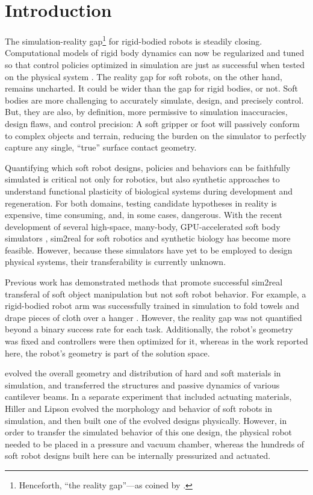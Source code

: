 \section{Introduction}
\label{sec:intro}

The simulation-reality gap\footnote{Henceforth, ``the reality gap''---as coined by \citet{jakobi1995noise}.} for rigid-bodied robots is steadily closing.
Computational models of rigid body dynamics can now be regularized and tuned so that control policies optimized in simulation are just as successful when tested on the physical system \cite{bongard2006resilient,hwangbo2019learning}.
The reality gap for soft robots, on the other hand, remains uncharted.
It could be wider than the gap for rigid bodies, or not.
Soft bodies are more challenging to accurately simulate, design, and precisely control.
But, they are also, by definition, more permissive to simulation inaccuracies, design flaws, and control precision: 	
A soft gripper or foot will passively conform to complex objects and terrain, reducing the burden on the simulator to perfectly capture any single, ``true'' surface contact geometry.

Quantifying which soft robot designs, policies and behaviors can be faithfully simulated is critical not only for robotics, but also synthetic approaches to understand functional plasticity of biological systems during development and regeneration.
For both domains, testing candidate hypotheses in reality is expensive, time consuming, and, in some cases, dangerous.
With the recent development of several high-space, many-body, GPU-accelerated 
soft body simulators \cite{holden2019subspace,macklin2019non},
sim2real for soft robotics and synthetic biology has become more feasible.
However, because these simulators have yet to be employed to design physical systems, their transferability is currently unknown.

Previous work has demonstrated methods that promote successful sim2real transferal of soft object manipulation but not soft robot behavior.
For example, a rigid-bodied robot arm was successfully trained in simulation to fold towels and drape pieces of cloth over a hanger \cite{matas2018sim}.
However, the reality gap was not quantified beyond a binary success rate for each task.
Additionally, the robot's geometry was fixed and controllers were then optimized for it, whereas in the work reported here, the robot's geometry is part of the solution space.

\citet{hiller2012automatic} evolved the overall geometry and distribution of hard and soft materials in simulation, and transferred the structures and passive dynamics of various cantilever beams.
In a separate experiment that included actuating materials, Hiller and Lipson evolved the morphology and behavior of soft robots in simulation, and then built one of the evolved designs physically. 
However, in order to transfer the simulated behavior of this one design, the physical robot needed to be placed in a pressure and vacuum chamber,
whereas the hundreds of soft robot designs built here can be internally pressurized and actuated.

